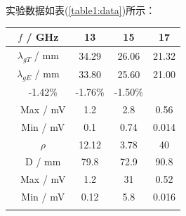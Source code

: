 \documentclass[a4paper]{article}
\begin{document}
实验数据如表(\ref{table1:data})所示：
\begin{table}[!h]
	\centering
	\begin{tabular}{|c|c|c|c|c|}
		\hline
		\multicolumn{2}{|c|}{$f$ / GHz}                               & 13                             & 15                            & 17                            									\\ \hline
		\multicolumn{2}{|c|}{$\lambda_{gT}$ / mm}                     & 34.29                          & 26.06                         & 21.32                         									\\ \hline
		\multicolumn{2}{|c|}{$\lambda_{gE}$ / mm}                     & 33.80	                       & 25.60                         & 21.00                         									\\ \hline
		\rowcolor[HTML]{EFEFEF}
		\multicolumn{2}{|c|}{\cellcolor[HTML]{EFEFEF}$\lambda_g$误差} & -1.42\%                        & -1.76\%                       & -1.50\%                        								\\ \hline
		                                                              & Max / mV                       & 1.2                   		   & 2.8		                   & 0.56							\\ \cline{2-5} 
		                                                              & Min / mV                       & 0.1                     	   & 0.74		                   & 0.014							\\ \cline{2-5}\hhline{~|----|}
		                                                              & \cellcolor[HTML]{EFEFEF}$\rho$ & \cellcolor[HTML]{EFEFEF}12.12 & \cellcolor[HTML]{EFEFEF}3.78  & \cellcolor[HTML]{EFEFEF}40 	\\ \cline{2-5}\hhline{~|----|}
		\multirow{-4}{*}{短路}                                        & \cellcolor[HTML]{EFEFEF}D / mm & \cellcolor[HTML]{EFEFEF}79.8  & \cellcolor[HTML]{EFEFEF}72.9  & \cellcolor[HTML]{EFEFEF}90.8 	\\ \hline
		                                                              & Max / mV                       & 1.2                       	   & 31	                           & 0.52							\\ \cline{2-5} 
		                                                              & Min / mV                       & 0.12                          & 5.8	                       & 0.016							\\ \cline{2-5}\hhline{~|----|}

\end{tabular}
\end{table}
\end{document}
